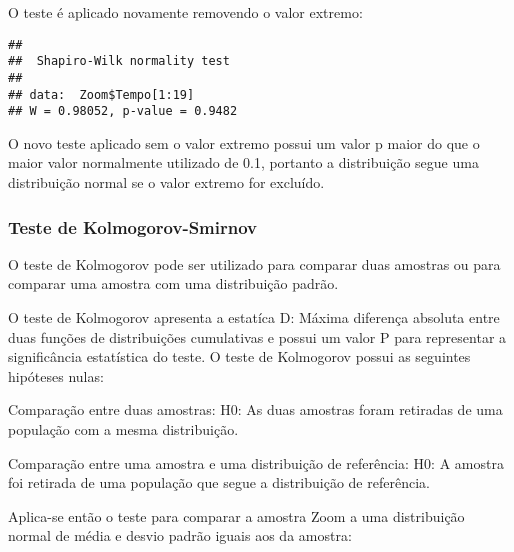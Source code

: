 \documentclass[
]{article}
\newenvironment{Shaded}{\begin{snugshade}}{\end{snugshade}}
\newcommand{\DataTypeTok}[1]{\textcolor[rgb]{0.13,0.29,0.53}{#1}}
\newcommand{\DecValTok}[1]{\textcolor[rgb]{0.00,0.00,0.81}{#1}}
\newcommand{\KeywordTok}[1]{\textcolor[rgb]{0.13,0.29,0.53}{\textbf{#1}}}
\newcommand{\NormalTok}[1]{#1}
\newcommand{\OperatorTok}[1]{\textcolor[rgb]{0.81,0.36,0.00}{\textbf{#1}}}
\newcommand{\StringTok}[1]{\textcolor[rgb]{0.31,0.60,0.02}{#1}}
\begin{document}
O teste é aplicado novamente removendo o valor extremo:

\begin{Shaded}
\end{Shaded}

\begin{verbatim}
## 
##  Shapiro-Wilk normality test
## 
## data:  Zoom$Tempo[1:19]
## W = 0.98052, p-value = 0.9482
\end{verbatim}

O novo teste aplicado sem o valor extremo possui um valor p maior do que
o maior valor normalmente utilizado de 0.1, portanto a distribuição
segue uma distribuição normal se o valor extremo for excluído.

\hypertarget{teste-de-kolmogorov-smirnov}{%
\subsubsection{Teste de
Kolmogorov-Smirnov}\label{teste-de-kolmogorov-smirnov}}

O teste de Kolmogorov pode ser utilizado para comparar duas amostras ou
para comparar uma amostra com uma distribuição padrão.

O teste de Kolmogorov apresenta a estatíca D: Máxima diferença absoluta
entre duas funções de distribuições cumulativas e possui um valor P para
representar a significância estatística do teste. O teste de Kolmogorov
possui as seguintes hipóteses nulas:

Comparação entre duas amostras: H0: As duas amostras foram retiradas de
uma população com a mesma distribuição.

Comparação entre uma amostra e uma distribuição de referência: H0: A
amostra foi retirada de uma população que segue a distribuição de
referência.

Aplica-se então o teste para comparar a amostra Zoom a uma distribuição
normal de média e desvio padrão iguais aos da amostra:

\begin{Shaded}
\end{Shaded}
\end{document}
